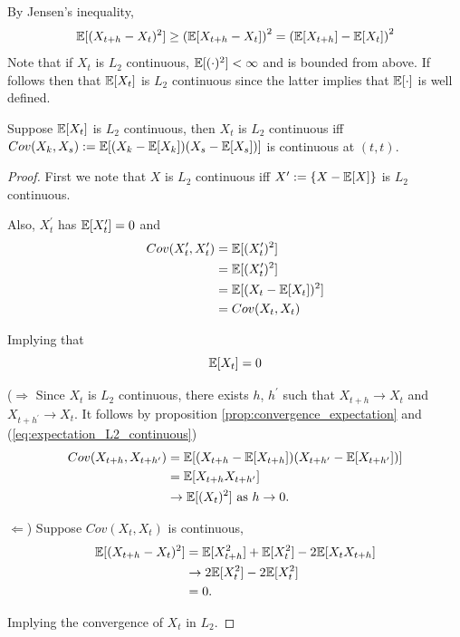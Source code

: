 \documentclass[../TGMAFFIRO]{subfiles}
\begin{document}
\begin{remark}
By Jensen's inequality,
	\begin{equation}
		\mathbb{E}[(X_{t+h} - X_{t})^2] \geq \left(\mathbb{E}[X_{t+h} - X_{t}]\right)^2	= \left(\mathbb{E}[X_{t+h}] - \mathbb{E}[X_{t}]\right)^2
	\end{equation}
Note that if $X_t$ is $L_2$ continuous, $\mathbb{E}[(\cdot)^2] < \infty$ and is bounded from above. If follows then that $\mathbb{E}[X_t]$ is $L_2$ continuous since the latter implies that $\mathbb{E}[\cdot]$ is well defined.
\end{remark}

\begin{theorem}
	Suppose $\mathbb{E}[X_t]$ is $L_2$ continuous, then $X_t$ is $L_2$ continuous iff $Cov(X_k, X_s) := \mathbb{E}[(X_k - \mathbb{E}[X_k])(X_s - \mathbb{E}[X_s])]$ is continuous at $(t,t)$.
\end{theorem}

\begin{proof}
First we note that $X$ is $L_2$ continuous iff $X^\prime:= \{X - \mathbb{E}[X]\}$ is $L_2$ continuous.

Also, $X_t^\prime$ has $\mathbb{E}[X_t^\prime] = 0$ and
\begin{align*}
	Cov(X_t^\prime, X_t^\prime) &= \mathbb{E}[(X_t^\prime) ^ 2] \\
								&= \mathbb{E}[(X_t^\prime)^2] \\
								&= \mathbb{E}[(X_t - \mathbb{E}[X_t])^2] \\
								&= Cov(X_t, X_t)
\end{align*}

Implying that 
\begin{equation}\label{eq:expectation_L2_continuous}
  \mathbb{E}[X_t] = 0
\end{equation}


($\Rightarrow$ Since $X_t$ is $L_2$ continuous, there exists $h$, $h^\prime$ such that $X_{t+h} \to X_t$ and $X_{t+h^\prime} \to X_t$. It follows by proposition \ref{prop:convergence_expectation} and (\ref{eq:expectation_L2_continuous})
\begin{align*}
	Cov(X_{t+h}, X_{t+h^\prime}) &= \mathbb{E}[(X_{t+h} - \mathbb{E}[X_{t+h}])(X_{t+h^\prime} - \mathbb{E}[X_{t+h^\prime}])]\\
								 &= \mathbb{E}[X_{t+h}X_{t+h^\prime}]\\
								 &\to \mathbb{E}[(X_{t})^2] \text{ as } h \to 0.
\end{align*}

$\Leftarrow$) Suppose $Cov(X_t, X_t)$ is continuous,
\begin{align*}
	\mathbb{E}[(X_{t+h} - X_t)^2] &= \mathbb{E}[X^2_{t+h}] + \mathbb{E}[X^2_{t}] - 2\mathbb{E}[X_{t}X_{t+h}]\\
						  &\to 2\mathbb{E}[X^2_t] -  2\mathbb{E}[X^2_t]\\
						  &= 0.
\end{align*}

Implying the convergence of $X_t$ in $L_2$.
\end{proof}
\end{document}
